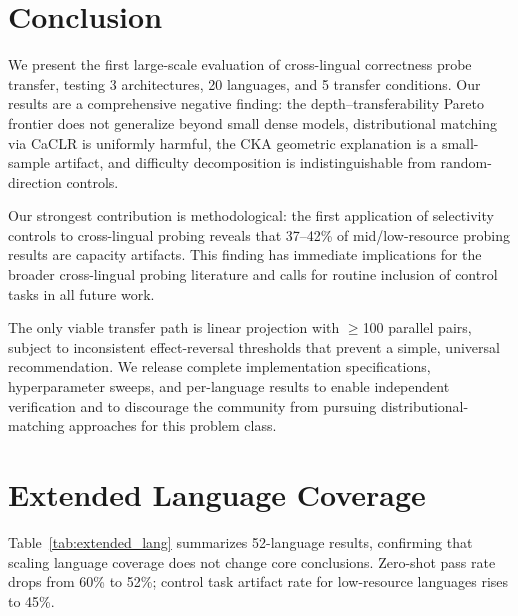 \documentclass[11pt,a4paper]{article}
\begin{document}
\section{Conclusion}
\label{sec:conclusion}

We present the first large-scale evaluation of cross-lingual correctness probe transfer, testing 3 architectures, 20 languages, and 5 transfer conditions.
Our results are a comprehensive negative finding: the depth--transferability Pareto frontier does not generalize beyond small dense models, distributional matching via CaCLR is uniformly harmful, the CKA geometric explanation is a small-sample artifact, and difficulty decomposition is indistinguishable from random-direction controls.

Our strongest contribution is methodological: the first application of selectivity controls to cross-lingual probing reveals that 37--42\% of mid/low-resource probing results are capacity artifacts.
This finding has immediate implications for the broader cross-lingual probing literature and calls for routine inclusion of control tasks in all future work.

The only viable transfer path is linear projection with $\geq$100 parallel pairs, subject to inconsistent effect-reversal thresholds that prevent a simple, universal recommendation.
We release complete implementation specifications, hyperparameter sweeps, and per-language results to enable independent verification and to discourage the community from pursuing distributional-matching approaches for this problem class.

% 
% 

\appendix
\section{Extended Language Coverage}
\label{app:extended}

Table~\ref{tab:extended_lang} summarizes 52-language results, confirming that scaling language coverage does not change core conclusions.
Zero-shot pass rate drops from 60\% to 52\%; control task artifact rate for low-resource languages rises to 45\%.
\end{document}
